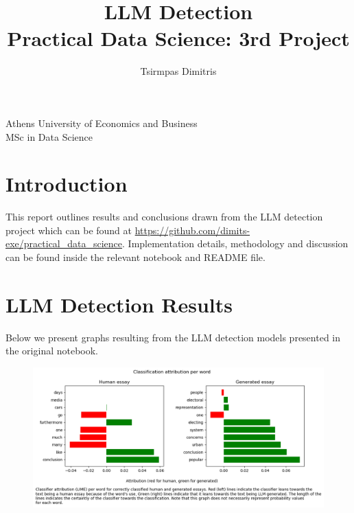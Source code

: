 \documentclass[11pt, a4paper]{article}
\title{\Huge LLM Detection\\
	\LARGE Practical Data Science: 3rd Project}
\author{\Large  Tsirmpas Dimitris }
\begin{document}
	
	\maketitle
	\begin{center}
		\large Athens University of Economics and Business \\
		\large MSc in Data Science
		
	\end{center}
	
	
	\section{Introduction}
	This report outlines results and conclusions drawn from the LLM detection project which can be found at \url{https://github.com/dimits-exe/practical_data_science}. Implementation details, methodology and discussion can be found inside the relevant notebook and README file.
	
	
	
	\section{LLM Detection Results}
	
	Below we present graphs resulting from the LLM detection models presented in the original notebook.
	
	\begin{figure}
		\includegraphics[width=14cm]{attribution.png}
		\centering
		\label{fig::attribution}
	\end{figure}
	
\end{document}
